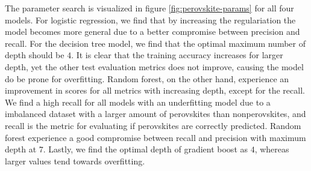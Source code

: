 \begin{table}[!ht]
\centering
\caption{Table with corresponding best estimators during a grid search scheme for predicting perovskites or not. The test score is here referred to as a balanced accuracy score, and we list all standard deviations in paranthesis.}
\label{tab:perovskite-optimal}
\noindent{}
\end{table}

The parameter search is visualized in figure \ref{fig:perovskite-params} for all four models. For logistic regression, we find that by increasing the regulariation the model becomes more general due to a better compromise between precision and recall. For the decision tree model, we find that the optimal maximum number of depth should be $4$. It is clear that the training accuracy increases for larger depth, yet the other test evaluation metrics does not improve, causing the model do be prone for overfitting. Random forest, on the other hand, experience an improvement in scores for all metrics with increasing depth, except for the recall. We find a high recall for all models with an underfitting model due to a imbalanced dataset with a larger amount of perovskites than nonperovskites, and recall is the metric for evaluating if perovskites are correctly predicted. Random forest experience a good compromise between recall and precision with maximum depth at $7$. Lastly, we find the optimal depth of gradient boost as $4$, whereas larger values tend towards overfitting.


